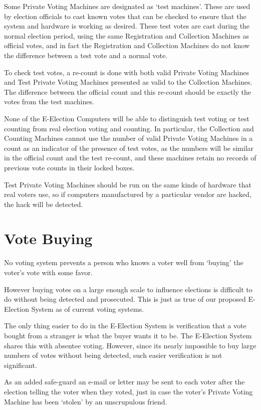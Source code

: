 \documentclass[12pt]{article}
\begin{document}
Some Private Voting Machines are designated as
`test machines'\label{TEST-MACHINE}.
These are used by election officials to cast known votes that can
be checked to ensure that the system and hardware is working as
desired.  These test votes are cast during the normal election
period, using the same Registration and Collection Machines
as official votes, and in fact the Registration and Collection Machines
do not know the difference between a test vote and a normal vote.

To check test votes, a re-count is done with both valid Private Voting
Machines and Test Private Voting Machines presented as valid to the
Collection Machines.  The difference between the official count and
this re-count should be exactly the votes from the test machines.

None of the E-Election Computers will be able to distinguish
test voting or test counting from real election voting and counting.
In particular, the Collection and Counting Machines cannot use the
number of valid Private Voting Machines in a count as an indicator
of the presence of test votes, as the numbers will be similar in the
official count and the test re-count, and these machines retain no
records of previous vote counts in their locked boxes.

Test Private Voting Machines should be run on the same kinds of
hardware that real voters use, so if computers manufactured by a
particular vendor are hacked, the hack will be detected.


\section{Vote Buying}

No voting system prevents a person who knows a voter well from
`buying' the voter's vote with some favor.

However buying votes on a large enough scale to influence elections
is difficult to do without being detected and prosecuted.
This is just as true of our proposed E-Election System as of
current voting systems.

The only thing easier to do in the E-Election System is verification
that a vote bought from a stranger
is what the buyer wants it to be.  The E-Election
System shares this with absentee voting.  However, since its
nearly impossible to buy large numbers of votes without being detected,
such easier verification is not significant.

As an added safe-guard an e-mail or letter may be sent to each voter after the
election telling the voter when they voted, just in case the voter's
Private Voting Machine has been `stolen' by an unscrupulous friend.
\end{document}
